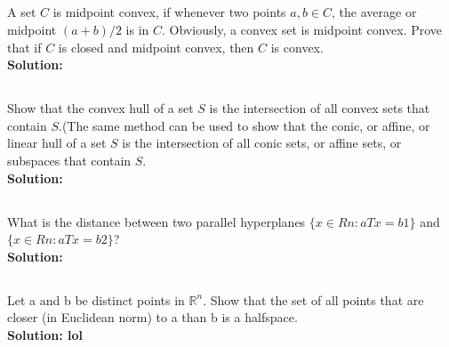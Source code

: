 \documentclass[10pt]{article}
\newcommand{\R}{\mathbb{R}}
\begin{document}
  	
  	\begin{center}
  	\section{}
  	\end{center}\par
  	  	A set $C$ is midpoint convex, if whenever two points $a, b \in C$, the average or midpoint
$(a + b)/2$ is in $C$. Obviously, a convex set is midpoint convex. Prove that if $C$ is closed and
midpoint convex, then $C$ is convex.\\
  	\textbf{Solution:}\par
  	\newpage  	
  	
  	
  	\begin{center}
  	\section{}
  	\end{center}\par
  	  	Show that the convex hull of a set $S$ is the intersection of all convex sets that contain
$S$.(The same method can be used to show that the conic, or affine, or linear hull of a set $S$ is
the intersection of all conic sets, or affine sets, or subspaces that contain $S$.\\
  	\textbf{Solution:}\par
  	\newpage
  	
  	
  	\begin{center}
  	\section{}
  	\end{center}\par
  	What is the distance between two parallel hyperplanes $\{x \in R n : a T x = b 1 \}$ and
$\{x \in R n : a T x = b 2 \}$?\\
  	\textbf{Solution:}\par
  	\newpage
  	
  	
  	\begin{center}
  	\section{}
  	\end{center}\par
  	Let a and b be distinct points in $\R^n$. Show that the set of all points that are closer (in
Euclidean norm) to a than b is a halfspace.\\
  	\textbf{Solution: lol}\par
  	\newpage
  	
\end{document}
